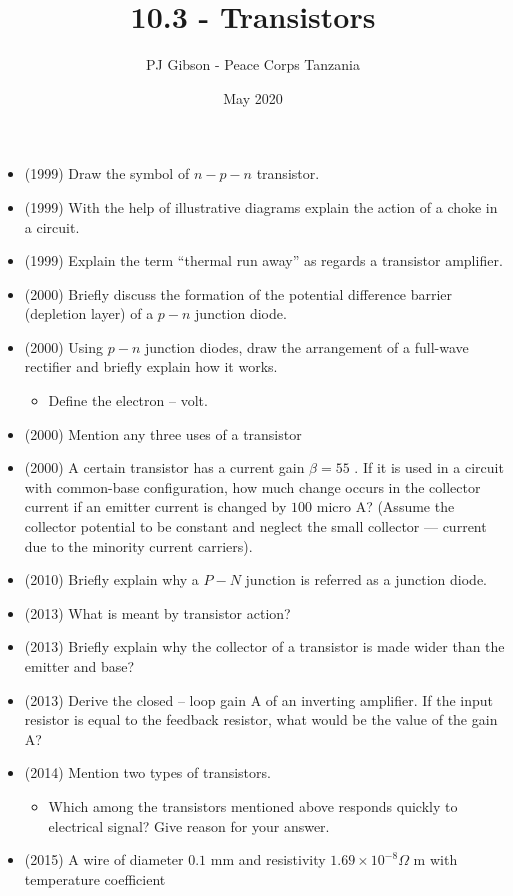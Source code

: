 \documentclass{article}
\title{\textbf{10.3 - Transistors}}
\author{PJ Gibson - Peace Corps Tanzania}
\date{May 2020}
\begin{document}
\maketitle

\begin{itemize}
\item (1999)  Draw the symbol of $ n-p-n$ transistor.
\item (1999)  With the help of illustrative diagrams explain the action of a choke in a circuit.
\item (1999)  Explain the term “thermal run away” as regards a transistor amplifier.
\item (2000)  Briefly discuss the formation of the potential difference barrier (depletion layer) of a $ p-n$ junction diode.
\item (2000)  Using $ p-n$ junction diodes, draw the arrangement of a full-wave rectifier and briefly explain how it works.
 \begin{itemize}
\item Define the electron – volt.
\end{itemize}
\item (2000)  Mention any three uses of a transistor
\item (2000)  A certain transistor has a current gain $  \beta =55$ . If it is used in a circuit with common-base configuration, how much change occurs in the collector current if an emitter current is changed by $ 100$ micro A? (Assume the collector potential to be constant and neglect the small collector — current due to the minority current carriers).
\item (2010)  Briefly explain why a $ P-N$ junction is referred as a junction diode.
\item (2013)  What is meant by transistor action?
\item (2013)  Briefly explain why the collector of a transistor is made wider than the emitter and base?
\item (2013)  Derive the closed – loop gain A of an inverting amplifier.  If the input resistor is equal to the feedback resistor, what would be the value of the gain A?
\item (2014)  Mention two types of transistors.
 \begin{itemize}
\item Which among the transistors mentioned above responds quickly to electrical signal? Give reason for your answer.
\end{itemize}
\item (2015)  A wire of diameter $ 0.1$ mm and resistivity $ 1.69\times10^{-8}\Omega$ m with temperature coefficient

\end{itemize}
\end{document}
